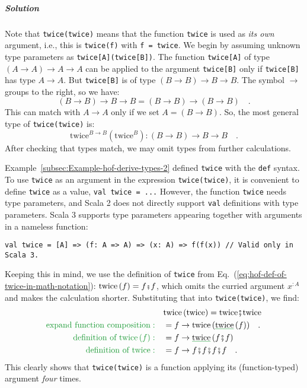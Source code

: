 \subparagraph{Solution}

Note that \lstinline!twice(twice)! means that the function \lstinline!twice!
is used as \emph{its own} argument, i.e., this is \lstinline!twice(f)!
with \lstinline!f = twice!. We begin by assuming unknown type parameters
as \lstinline!twice[A](twice[B])!. The function \lstinline!twice[A]!
of type $\left(A\rightarrow A\right)\rightarrow A\rightarrow A$ can
be applied to the argument \lstinline!twice[B]! only if \lstinline!twice[B]!
has type $A\rightarrow A$. But \lstinline!twice[B]! is of type $\left(B\rightarrow B\right)\rightarrow B\rightarrow B$.
The symbol $\rightarrow$ groups to the right, so we have:
\[
\left(B\rightarrow B\right)\rightarrow B\rightarrow B=\left(B\rightarrow B\right)\rightarrow\left(B\rightarrow B\right)\quad.
\]
This can match with $A\rightarrow A$ only if we set $A=\left(B\rightarrow B\right)$.
So, the most general type of \lstinline!twice(twice)! is:
\begin{equation}
\text{twice}^{B\rightarrow B}(\text{twice}^{B}):\left(B\rightarrow B\right)\rightarrow B\rightarrow B\quad.\label{eq:hof-twice-example-solved3}
\end{equation}
After checking that types match, we may omit types from further calculations.

Example~\ref{subsec:Example-hof-derive-types-2} defined \lstinline!twice!
with the \lstinline!def! syntax. To use \lstinline!twice! as an
argument in the expression \lstinline!twice(twice)!, it is convenient
to define \lstinline!twice! as a value, \lstinline!val twice = ...!
However, the function \lstinline!twice! needs type parameters, and
Scala 2 does not directly support \lstinline!val! definitions with
type parameters. Scala 3 supports type parameters appearing together
with arguments in a nameless function:
\begin{lstlisting}
val twice = [A] => (f: A => A) => (x: A) => f(f(x)) // Valid only in Scala 3.
\end{lstlisting}
Keeping this in mind, we use the definition of \lstinline!twice!
from Eq.~(\ref{eq:hof-def-of-twice-in-math-notation}): $\text{twice}\,(f)=f\bef f$,
which omits the curried argument $x^{:A}$ and makes the calculation
shorter. Substituting that into \lstinline!twice(twice)!, we find:
\begin{align*}
 & \text{twice}\,(\text{twice})=\text{twice}\bef\text{twice}\\
{\color{greenunder}\text{expand function composition}:}\quad & =f\rightarrow\text{twice}\,(\gunderline{\text{twice}}\,(f))\quad.\\
{\color{greenunder}\text{definition of }\text{twice}\,(f):}\quad & =f\rightarrow\gunderline{\text{twice}}\,(f\bef f)\\
{\color{greenunder}\text{definition of twice}:}\quad & =f\rightarrow f\bef f\bef f\bef f\quad.
\end{align*}
This clearly shows that \lstinline!twice(twice)! is a function applying
its (function-typed) argument \emph{four} times.

